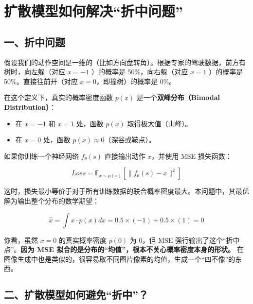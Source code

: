 \clearpage

\hypertarget{ux6269ux6563ux6a21ux578bux5982ux4f55ux89e3ux51b3ux6298ux4e2dux95eeux9898}{%
\section{扩散模型如何解决``折中问题''}\label{ux6269ux6563ux6a21ux578bux5982ux4f55ux89e3ux51b3ux6298ux4e2dux95eeux9898}}

\hypertarget{ux4e00ux6298ux4e2dux95eeux9898}{%
\subsection{一、折中问题}\label{ux4e00ux6298ux4e2dux95eeux9898}}

假设我们的动作空间是一维的（比如方向盘转角）。根据专家的驾驶数据，前方有树时，向左躲（对应 \(x=-1\) ）的概率是 50\%，向右躲（对应 \(x=1\) ）的概率是 50\%。直接往前开（对应 \(x=0\)，即撞树）的概率是 0\%。

在这个定义下，真实的概率密度函数 \(p(x)\) 是一个\textbf{双峰分布（Bimodal Distribution）}：

\begin{itemize}
\tightlist
\item
  在 \(x=-1\) 和 \(x=1\) 处，函数 \(p(x)\) 取得极大值（山峰）。
\item
  在 \(x=0\) 处，函数 \(p(x)\approx 0\)（深谷或鞍点）。
\end{itemize}

如果你训练一个神经网络 \(f_\theta(s)\) 直接输出动作 \(x\)，并使用 MSE 损失函数：

\[
Loss=\mathbb{E}_{x\sim p(x)}\left[\lVert f_\theta(s)-x\rVert^2\right]
\]

这时，损失最小等价于对于所有训练数据的联合概率密度最大。本问题中，其最优解为输出整个分布的数学期望：

\[
\hat{x}=\int x\cdot p(x)dx=0.5\times(-1)+0.5\times(1)=0
\]

你看，虽然 \(x=0\) 的真实概率密度 \(p(0)\) 为 0，但 MSE 强行输出了这个``折中点''。\textbf{因为 MSE 拟合的是分布的``均值''，根本不关心概率密度本身的形状。}
在图像生成中也是类似的，很容易取不同图片像素的均值，生成一个``四不像''的东西。

\hypertarget{ux4e8cux6269ux6563ux6a21ux578bux5982ux4f55ux907fux514dux6298ux4e2d}{%
\subsection{二、扩散模型如何避免``折中''？}\label{ux4e8cux6269ux6563ux6a21ux578bux5982ux4f55ux907fux514dux6298ux4e2d}}

